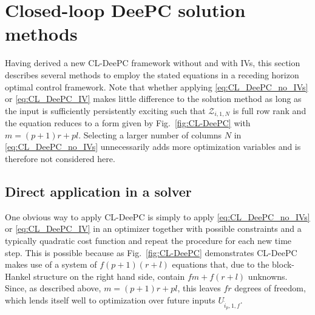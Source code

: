 \section{Closed-loop \acs{DeePC} solution methods}\label{sec:SolutionMethods}
Having derived a new \ac{CL-DeePC} framework without and with \ac{IVs}, this section describes several methods to employ the stated equations in a receding horizon optimal control framework. Note that whether applying \eqref{eq:CL_DeePC_no_IVs} or \eqref{eq:CL_DeePC_IV} makes little difference to the solution method as long as the input is sufficiently persistently exciting such that $\mathcal{Z}_{i,1,N}$ is full row rank and the equation reduces to a form given by Fig.~\ref{fig:CL-DeePC} with ${m=(p+1)r+pl}$. Selecting a larger number of columns $N$ in \eqref{eq:CL_DeePC_no_IVs} unnecessarily adds more optimization variables and is therefore not considered here.
%
\subsection{Direct application in a solver}
One obvious way to apply \ac{CL-DeePC} is simply to apply \eqref{eq:CL_DeePC_no_IVs} or \eqref{eq:CL_DeePC_IV} in an optimizer together with possible constraints and a typically quadratic cost function and repeat the procedure for each new time step. This is possible because as Fig.~\ref{fig:CL-DeePC} demonstrates \ac{CL-DeePC} makes use of a system of $f(p+1)(r+l)$ equations that, due to the block-Hankel structure on the right hand side, contain $fm+f(r+l)$ unknowns. Since, as described above, ${m=(p+1)r+pl}$, this leaves $fr$ degrees of freedom, which lends itself well to optimization over future inputs $U_{\hat{i}_p,1,f}$.
%
